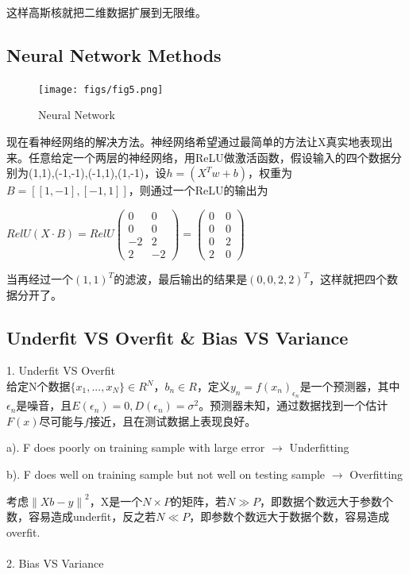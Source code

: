 \documentclass[12pt,UTF8,AutoFakeBold]{article}
\begin{document}
这样高斯核就把二维数据扩展到无限维。

\subsection{Neural Network Methods}

\begin{figure}%
\texttt{[image: figs/fig5.png]}
\caption{Neural Network}\label{fig5}
\end{figure}

现在看神经网络的解决方法。神经网络希望通过最简单的方法让X真实地表现出来。任意给定一个两层的神经网络，用ReLU做激活函数，假设输入的四个数据分别为{(1,1),(-1,-1),(-1,1),(1,-1)}，设$h=(X^Tw+b)$，权重为$B=[[1,-1],[-1,1]]$，则通过一个ReLU的输出为

${ RelU }(X\cdot B)={ RelU }\left( \begin{array}{ll} { 0 } & { 0 } \\ { 0 } & { 0 } \\ { -2 } & { 2 } \\ { 2 } & { -2 } \end{array} \right) =\left( \begin{array}{l} { 0\quad 0 } \\ { 0\quad 0 } \\ { 0\quad 2 } \\ { 2\quad 0 } \end{array} \right) $

当再经过一个$(1,1)^T$的滤波，最后输出的结果是$(0,0,2,2)^T$，这样就把四个数据分开了。

\subsection{Underfit VS Overfit \& Bias VS Variance}

1. Underfit VS Overfit
\\

给定N个数据$\{x_1,...,x_N\}\in R^N$，$b_n\in R$，定义$y_n=f(x_n)_\epsilon_n$是一个预测器，其中$\epsilon_n$是噪音，且$E(\epsilon_n)=0,D(\epsilon_n)=\sigma^2$。预测器未知，通过数据找到一个估计$F(x)$尽可能与$f$接近，且在测试数据上表现良好。

a). F does poorly on training sample with large error $\rightarrow$ Underfitting

b). F does well on training sample but not well on testing sample $\rightarrow$ Overfitting

考虑${ \left\| Xb-y \right\|  }^{ 2 }$，X是一个$N\times P$的矩阵，若$N\gg P$，即数据个数远大于参数个数，容易造成underfit，反之若$N \ll P$，即参数个数远大于数据个数，容易造成overfit.
\\
\\2. Bias VS Variance
\\
\end{document}
